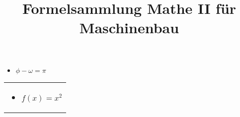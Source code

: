 \documentclass{tudexercise}
\begin{document}
	\title{Formelsammlung Mathe II f\"ur Maschinenbau}
	\date{}
	\author{}
	\maketitle
	
\begin{minipage}[t]{0,45 \textwidth}
	\begin{itemize}
	\item $\phi - \omega = \pi$
	\end{itemize}
\end{minipage}%
\hfill
\begin{minipage}[t]{0,45 \textwidth}
	\begin{tabular}{|p{\textwidth}}
		\begin{itemize}
			\item $f(x) = x^2$
		\end{itemize}

\end{tabular}
\end{minipage}%
\end{document}
